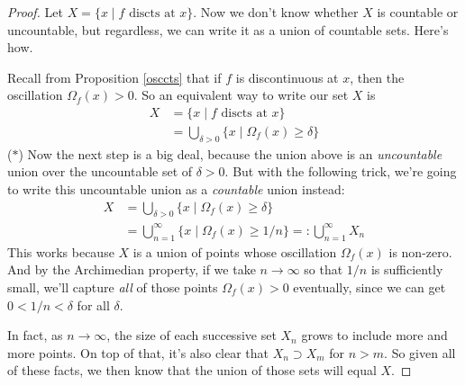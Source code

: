 \documentclass[12pt]{article}
\theoremstyle{plain}
\theoremstyle{definition}
\theoremstyle{remark}
\begin{document}
\begin{proof}
Let $X=\{x \; | \; \text{$f$ discts at $x$} \}$. Now we don't know whether $X$ is countable or uncountable, but regardless, we can write it as a union of countable sets.  Here's how.

Recall from Proposition \ref{osccts} that if $f$ is discontinuous at $x$, then the oscillation $\Omega_f(x) > 0$. So an equivalent way to write our set $X$ is 
\begin{align*}
    X &= \{x \; | \; \text{$f$ discts at $x$} \} \\
        &= \bigcup_{\delta>0} \{x \; | \; \Omega_f(x)\geq \delta \} 
\end{align*}
($*$) Now the next step is a big deal, because the union above is an \emph{uncountable} union over the uncountable set of $\delta>0$. But with the following trick, we're going to write this uncountable union as a \emph{countable} union instead: 
\begin{align*}
    X &= \bigcup_{\delta>0} \{x \; | \; \Omega_f(x)\geq \delta \} \\
    &= \bigcup^\infty_{n=1} \{x \; | \; \Omega_f(x)\geq 1/n \} =: \bigcup^\infty_{n=1}  X_n
\end{align*}
This works because $X$ is a union of points whose oscillation $\Omega_f(x)$ is non-zero. And by the Archimedian property, if we take $n\rightarrow \infty$ so that $1/n$ is sufficiently small, we'll capture \emph{all} of those points $\Omega_f(x)>0$ eventually, since we can get $0<1/n<\delta$ for all $\delta$. 

In fact, as $n\rightarrow\infty$, the size of each successive set $X_n$ grows to include more and more points. On top of that, it's also clear that $X_n\supset X_m$ for $n>m$. So given all of these facts, we then know that the union of those sets will equal $X$.


\end{proof}
\end{document}

